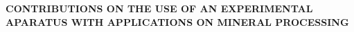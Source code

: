 \documentclass[a4paper,12pt,fleqn]{article}
\begin{document}
	\begin{center}
		{\bfseries\fontsize{14}{16}\selectfont CONTRIBUTIONS ON THE USE OF AN EXPERIMENTAL APARATUS WITH APPLICATIONS ON MINERAL PROCESSING}
	\end{center}

	\begin{justify}

	\end{justify}

	\thispagestyle{primeirapagina} %

	\newpage %
	

\end{document}
